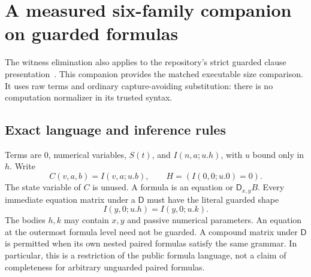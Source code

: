 \section{A measured six-family companion on guarded formulas}
\label{sec:guarded-companion}

The witness elimination also applies to the repository's strict guarded
clause presentation~\cite{deterministic}. This companion provides the matched executable size
comparison.  It uses raw terms and ordinary capture-avoiding substitution:
there is no computation normalizer in its trusted syntax.

\subsection{Exact language and inference rules}

Terms are $0$, numerical variables, $S(t)$, and $I(n,a;u.h)$, with $u$
bound only in $h$.  Write
\[
 C(v,a,b)=I(v,a;u.b),\qquad
 H=(I(0,0;u.0)=0).
\]
The state variable of $C$ is unused.  A formula is an equation or
$\mathsf D_{x,y}B$.  Every immediate equation matrix under a
$\mathsf D$ must have the literal guarded shape
\[
       I(y,0;u.h)=I(y,0;u.k).
       \tag{G}\label{eq:guarded-matrix}
\]
The bodies $h,k$ may contain $x,y$ and passive numerical parameters.
An equation at the outermost formula level need not be guarded.  A
compound matrix under $\mathsf D$ is permitted when its own nested
paired formulas satisfy the same grammar.  In particular, this is a
restriction of the public formula language, not a claim of completeness
for arbitrary unguarded paired formulas.

